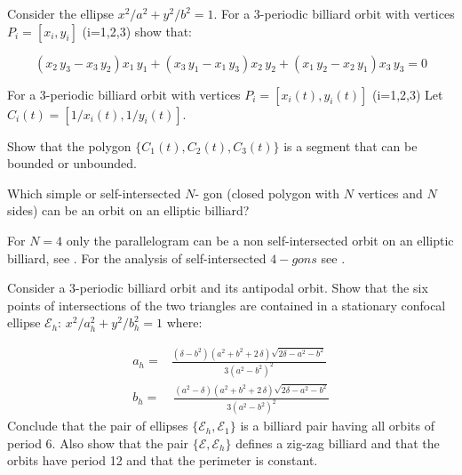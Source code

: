 \begin{exercise}
 Consider the ellipse $x^2/a^2+y^2/b^2=1$. For a  3-periodic  billiard orbit with vertices $P_i=[x_i,y_i]$ (i=1,2,3)  show that:  

\[ 
 \left( x_2\,y_3-x_3\,y_2 \right) x_1\,
y_1+ \left(x_3\,y_1  - x_1\,y_3\right) x_2\, y_2+ \left( x_1\,y_2-x_2\,y_1 \right) x_3
\,y_3=0
\]

\end{exercise}

\begin{exercise} For a  3-periodic  billiard orbit with vertices $P_i=[x_i(t),y_i(t)]$ (i=1,2,3)
Let $C_i(t)=[1/x_i(t),1/y_i(t)]$. 

Show that the polygon $\{C_1(t),C_2(t),C_3(t)\}$ is a segment that can be bounded or unbounded.
 \label{exe:chap02-inverse-envelope}
\end{exercise}

\begin{exercise} Which simple or self-intersected $N$- gon (closed polygon with $N$ vertices and $N$ sides) can be an orbit on an elliptic billiard? 

 For $N=4$ only the parallelogram can be a non self-intersected orbit on an elliptic billiard, see \cite{connes07}. For the analysis of self-intersected $4-gons$ see \cite{garcia2020-self-intersected}.
\end{exercise}

\begin{exercise}
 Consider a 3-periodic billiard orbit and its antipodal orbit. Show that the six points of intersections of the two triangles are contained in a stationary confocal ellipse $\mathcal{E}_h$: $x^2/a_h^2+y^2/b_h^2=1$ where:


\begin{align*}
	a_h=& {\frac { \left(  \delta -b^2\right) \left( {a}^{2}+{b}^{2}+2\,\delta \right)\sqrt {2\delta-{a}^{2}-{b}^{2} 
			 }  }{3 \left( {a}^{2}-{
				b}^{2} \right) ^{2}}}\\
b_h=&  \,{\frac {\left( {a}^{2}-\delta \right)  \left( {a}^{2}+{b}^{2}+2\,\delta \right) \sqrt {2\delta -{a}^{2
			}-{b}^{2} } }{3 \left( {a}^{2}-
		{b}^{2} \right) ^{2}}}
%
\end{align*}
Conclude that the pair of ellipses $\{\mathcal{E}_h, \mathcal{E}_1\}$ is a billiard pair having all orbits of period 6.
Also show that the pair $\{\mathcal{E} , \mathcal{E}_h \}$ defines a zig-zag billiard and that the orbits have period 12 and  that the perimeter is  constant. %
\end{exercise}

